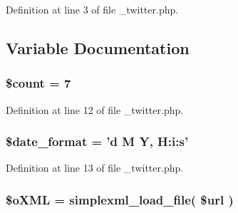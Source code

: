 Definition at line 3 of file \-\_\-twitter.\-php.



\subsection{Variable Documentation}
\hypertarget{live_2modules_2main_2templates_2__twitter_8php_af789423037bbc89dc7c850e761177570}{
\subsubsection[{\$count}]{\setlength{\rightskip}{0pt plus 5cm}\$count = 7}}\label{live_2modules_2main_2templates_2__twitter_8php_af789423037bbc89dc7c850e761177570}


Definition at line 12 of file \-\_\-twitter.\-php.

\hypertarget{live_2modules_2main_2templates_2__twitter_8php_acca3fdcdfc67e06cb49a87e476d364a8}{
\subsubsection[{\$date\-\_\-format}]{\setlength{\rightskip}{0pt plus 5cm}\$date\-\_\-format = 'd M Y, H\-:i\-:s'}}\label{live_2modules_2main_2templates_2__twitter_8php_acca3fdcdfc67e06cb49a87e476d364a8}


Definition at line 13 of file \-\_\-twitter.\-php.

\hypertarget{live_2modules_2main_2templates_2__twitter_8php_abfda312091a06ff6040c5a2f584e8b99}{
\subsubsection[{\$o\-X\-M\-L}]{\setlength{\rightskip}{0pt plus 5cm}\$o\-X\-M\-L = simplexml\-\_\-load\-\_\-file( \$url )}}\label{live_2modules_2main_2templates_2__twitter_8php_abfda312091a06ff6040c5a2f584e8b99}


